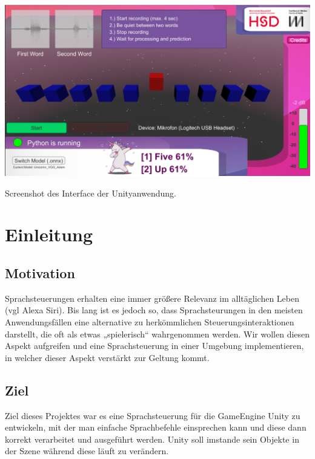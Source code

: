 \documentclass[sigconf]{acmart}
\begin{document}
\begin{teaserfigure}
  \includegraphics[width=\textwidth]{images/Demo}
  \caption{Screenshot des Interface der Unityanwendung.}
  \label{fig:UnityApp}
\end{teaserfigure}

\maketitle
\newpage
\section{Einleitung}

\subsection{Motivation}
Sprachsteuerungen erhalten eine immer größere Relevanz im alltäglichen Leben (vgl Alexa Siri). Bis lang ist es jedoch so, dass Sprachsteurungen in den meisten Anwendungsfällen eine alternative zu herkömmlichen Steuerungsinteraktionen darstellt, die oft als etwas „spielerisch“ wahrgenommen werden. Wir wollen diesen Aspekt aufgreifen und eine Sprachsteuerung in einer Umgebung implementieren, in welcher dieser Aspekt verstärkt zur Geltung kommt.

\subsection{Ziel}
Ziel dieses Projektes war es eine Sprachsteuerung für die GameEngine Unity zu entwickeln, mit der man einfache Sprachbefehle einsprechen kann und diese dann korrekt verarbeitet und ausgeführt werden. Unity soll imstande sein Objekte in der Szene während diese läuft zu verändern.
\end{document}
